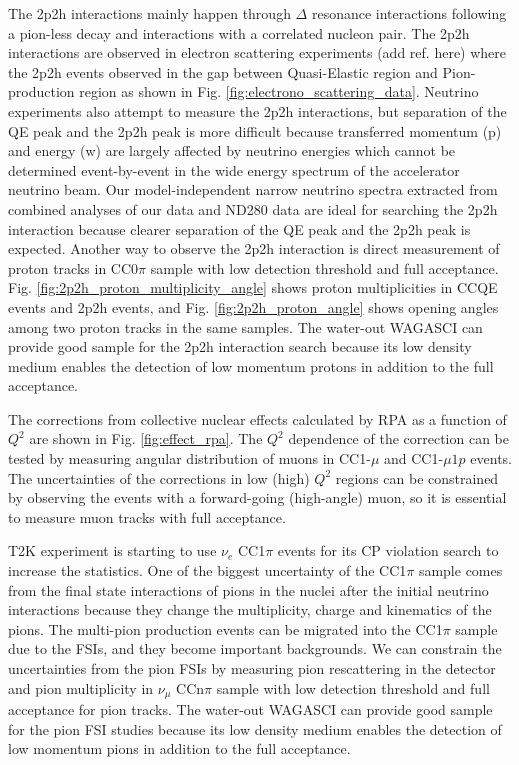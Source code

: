 The 2p2h interactions mainly happen through $\Delta$ resonance interactions following a pion-less decay and interactions with a correlated nucleon pair.
The 2p2h interactions are observed in electron scattering experiments (add ref. here) where the 2p2h events observed in the gap between Quasi-Elastic region and Pion-production region as shown in Fig. \ref{fig:electrono_scattering_data}.
Neutrino experiments also attempt to measure the 2p2h interactions, but separation of the QE peak and the 2p2h peak is more difficult because transferred momentum (p) and energy (w) are largely affected by  neutrino energies which cannot be determined event-by-event in the wide energy spectrum of the accelerator neutrino beam.
Our model-independent narrow neutrino spectra extracted from combined analyses of our data and ND280 data are ideal for searching the 2p2h interaction because clearer separation of the QE peak and the 2p2h peak is expected.
Another way to observe the 2p2h interaction is direct measurement of proton tracks in CC0$\pi$ sample with low detection threshold and full acceptance.
Fig. \ref{fig:2p2h_proton_multiplicity_angle} shows proton multiplicities in CCQE events and 2p2h events, and Fig. \ref{fig:2p2h_proton_angle} shows opening angles among two proton tracks in the same samples.
The water-out WAGASCI can provide good sample for the 2p2h interaction search because its low density medium enables the detection of low momentum protons in addition to the full acceptance.


The corrections from collective nuclear effects calculated by RPA as a function of $Q^{2}$ are shown in Fig. \ref{fig:effect_rpa}.
The $Q^{2}$ dependence of the correction can be tested by measuring angular distribution of muons in CC1-$\mu$ and CC1-$\mu 1p$ events.
The uncertainties of the corrections in low (high) $Q^{2}$ regions can be constrained by observing the events with a forward-going (high-angle) muon, so it is essential to measure muon tracks with full acceptance.


T2K experiment is starting to use $\nu_{e}$ CC1$\pi$ events for its CP violation search to increase the statistics.
One of the biggest uncertainty of the CC1$\pi$ sample comes from the final state interactions of pions in the nuclei after the initial neutrino interactions because they change the multiplicity, charge and kinematics of the pions.
The multi-pion production events can be migrated into the CC1$\pi$ sample due to the FSIs, and they become important backgrounds.
We can constrain the uncertainties from the pion FSIs by measuring pion rescattering in the detector and pion multiplicity in $\nu_{\mu}$ CCn$\pi$ sample with low detection threshold and full acceptance for pion tracks.
The water-out WAGASCI can provide good sample for the pion FSI studies because its low density medium enables the detection of low momentum pions in addition to the full acceptance.

